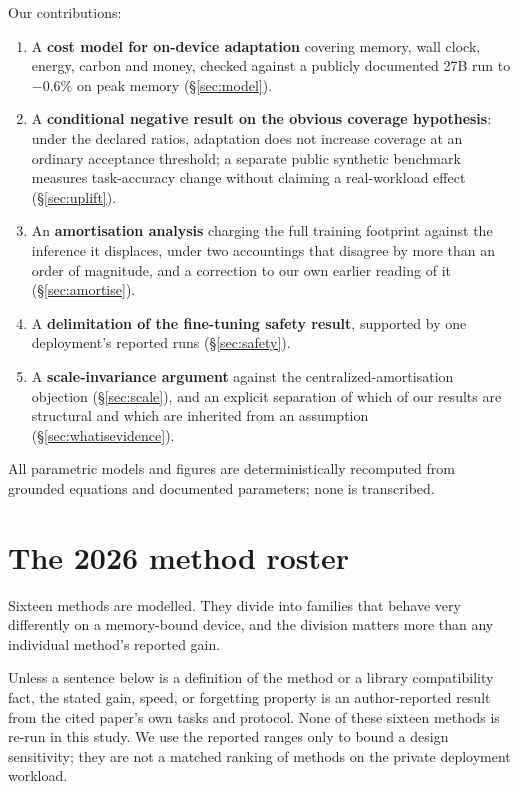 \documentclass[conference]{IEEEtran}
\begin{document}
Our contributions:

\begin{enumerate}
\item A \textbf{cost model for on-device adaptation} covering memory, wall
      clock, energy, carbon and money, checked against a publicly documented 27B run to
      $-0.6\%$ on peak memory (\S\ref{sec:model}).
\item A \textbf{conditional negative result on the obvious coverage hypothesis}:
      under the declared ratios, adaptation does not increase coverage at an
      ordinary acceptance threshold; a separate public synthetic benchmark
      measures task-accuracy change without claiming a real-workload effect
      (\S\ref{sec:uplift}).
\item An \textbf{amortisation analysis} charging the full training footprint
      against the inference it displaces, under two accountings that disagree
      by more than an order of magnitude, and a correction to our own earlier
      reading of it (\S\ref{sec:amortise}).
\item A \textbf{delimitation of the fine-tuning safety result}, supported by
      one deployment's reported runs (\S\ref{sec:safety}).
\item A \textbf{scale-invariance argument} against the
      centralized-amortisation objection (\S\ref{sec:scale}), and an explicit
      separation of which of our results are structural and which are inherited
      from an assumption (\S\ref{sec:whatisevidence}).
\end{enumerate}

All parametric models and figures are deterministically recomputed from
grounded equations and documented parameters; none is transcribed.

\section{The 2026 method roster}
\label{sec:roster}

Sixteen methods are modelled. They divide into families that behave very
differently on a memory-bound device, and the division matters more than any
individual method's reported gain.

Unless a sentence below is a definition of the method or a library
compatibility fact, the stated gain, speed, or forgetting property is an
author-reported result from the cited paper's own tasks and protocol. None of
these sixteen methods is re-run in this study. We use the reported ranges only
to bound a design sensitivity; they are not a matched ranking of methods on the
private deployment workload.
\end{document}
